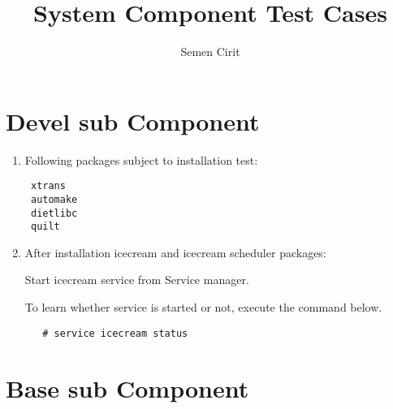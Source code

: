 \documentclass[a4paper,10pt]{article}
\title{System Component Test Cases}
\author{Semen Cirit}
\begin{document}
\maketitle


\section{Devel sub Component}
\begin{enumerate}
 \item Following packages subject to installation test:
\begin{verbatim}
 xtrans
 automake
 dietlibc 
 quilt
\end{verbatim}
 \item After installation  icecream and icecream scheduler packages:

Start icecream service from Service manager.

To learn whether service is started or not, execute the command below.
 \begin{verbatim}
   # service icecream status
 \end{verbatim}

\end{enumerate}


\section{Base sub Component}
\end{document}
